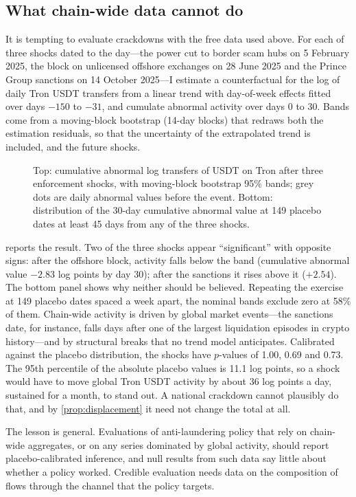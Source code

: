 \subsection{What chain-wide data cannot do}\label{sec:eventstudy}

It is tempting to evaluate crackdowns with the free data used above. For each of three shocks dated to the day---the
power cut to border scam hubs on 5 February 2025, the block on unlicensed offshore exchanges on 28 June 2025 and the
Prince Group sanctions on 14 October 2025---I estimate a counterfactual for the log of daily Tron USDT transfers from a
linear trend with day-of-week effects fitted over days $-150$ to $-31$, and cumulate abnormal activity over days 0 to
30. Bands come from a moving-block bootstrap (14-day blocks) that redraws both the estimation residuals, so that the
uncertainty of the extrapolated trend is included, and the future shocks.

\begin{figure}[!htbp]
\centering
{}
\caption{Top: cumulative abnormal log transfers of USDT on Tron after three enforcement shocks, with moving-block
bootstrap 95\% bands; grey dots are daily abnormal values before the event. Bottom: distribution of the 30-day
cumulative abnormal value at 149 placebo dates at least 45 days from any of the three shocks.}
\label{fig:eventstudy}
\end{figure}

 reports the result. Two of the three shocks appear ``significant'' with opposite signs: after the
offshore block, activity falls below the band (cumulative abnormal value $-2.83$ log points by day 30); after the
sanctions it rises above it ($+2.54$). The bottom panel shows why neither should be believed. Repeating the exercise at
149 placebo dates spaced a week apart, the nominal bands exclude zero at 58\% of them. Chain-wide activity is driven by
global market events---the sanctions date, for instance, falls days after one of the largest liquidation episodes in
crypto history---and by structural breaks that no trend model anticipates. Calibrated against the placebo distribution,
the shocks have $p$-values of 1.00, 0.69 and 0.73. The 95th percentile of the absolute placebo values is 11.1 log
points, so a shock would have to move global Tron USDT activity by about 36 log points a day, sustained for a month,
to stand out. A national crackdown cannot plausibly do that, and by \cref{prop:displacement} it need not change the
total at all.

The lesson is general. Evaluations of anti-laundering policy that rely on chain-wide aggregates, or on any series
dominated by global activity, should report placebo-calibrated inference, and null results from such data say little
about whether a policy worked. Credible evaluation needs data on the composition of flows through the channel that the
policy targets.
